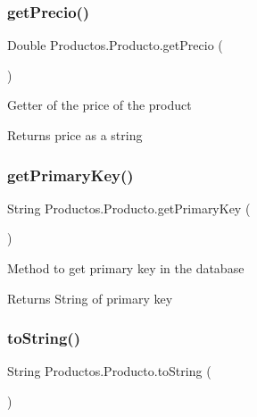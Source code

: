 \subsubsection{\texorpdfstring{get\+Precio()}{getPrecio()}}
{\footnotesize\ttfamily Double Productos.\+Producto.\+get\+Precio (\begin{DoxyParamCaption}{ }\end{DoxyParamCaption})\hspace{0.3cm}{\ttfamily [inline]}}

Getter of the price of the product

\begin{DoxyReturn}{Returns}
price as a string 
\end{DoxyReturn}
\mbox{\label{class_productos_1_1_producto_a3b9f2b2cfcbbc5708e65dbfeee373528}} 
\subsubsection{\texorpdfstring{get\+Primary\+Key()}{getPrimaryKey()}}
{\footnotesize\ttfamily String Productos.\+Producto.\+get\+Primary\+Key (\begin{DoxyParamCaption}{ }\end{DoxyParamCaption})\hspace{0.3cm}{\ttfamily [inline]}}

Method to get primary key in the database

\begin{DoxyReturn}{Returns}
String of primary key 
\end{DoxyReturn}
\mbox{\label{class_productos_1_1_producto_a0516e55bd0c688748075bb13fd949595}} 
\subsubsection{\texorpdfstring{to\+String()}{toString()}}
{\footnotesize\ttfamily String Productos.\+Producto.\+to\+String (\begin{DoxyParamCaption}{ }\end{DoxyParamCaption})\hspace{0.3cm}{\ttfamily [inline]}}

